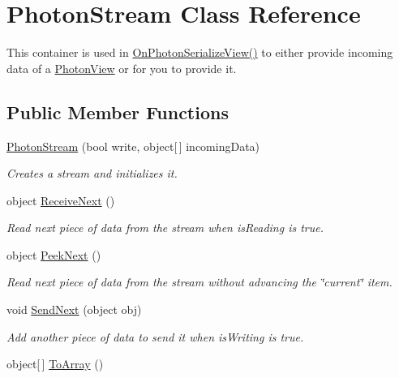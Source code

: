 \hypertarget{class_photon_stream}{}\section{Photon\+Stream Class Reference}
\label{class_photon_stream}


This container is used in \hyperlink{group__public_api_ggaf30bbea51cc8c4b1ddc239d1c5c1468fa864e7f0d7510922caf9c107b8dd771a3}{On\+Photon\+Serialize\+View()} to either provide incoming data of a \hyperlink{class_photon_view}{Photon\+View} or for you to provide it.  


\subsection*{Public Member Functions}
\begin{DoxyCompactItemize}
\item 
\hyperlink{class_photon_stream_a87b96b24a15203e84e5bb3f3996609d0}{Photon\+Stream} (bool write, object\mbox{[}$\,$\mbox{]} incoming\+Data)
\begin{DoxyCompactList}\small\item\em Creates a stream and initializes it. \end{DoxyCompactList}\item 
object \hyperlink{class_photon_stream_ae1bda0f78819d5b29d72c968b856781b}{Receive\+Next} ()
\begin{DoxyCompactList}\small\item\em Read next piece of data from the stream when is\+Reading is true.\end{DoxyCompactList}\item 
object \hyperlink{class_photon_stream_a1e34f079e1ab0c8a86cb864bc6aa5443}{Peek\+Next} ()
\begin{DoxyCompactList}\small\item\em Read next piece of data from the stream without advancing the \char`\"{}current\char`\"{} item.\end{DoxyCompactList}\item 
void \hyperlink{class_photon_stream_a8b1a1e59820ff95d2d2dd4c376841322}{Send\+Next} (object obj)
\begin{DoxyCompactList}\small\item\em Add another piece of data to send it when is\+Writing is true.\end{DoxyCompactList}\item 
object\mbox{[}$\,$\mbox{]} \hyperlink{class_photon_stream_a546034701bbab3d113219f81c0ae8080}{To\+Array} ()

\end{DoxyCompactItemize}
